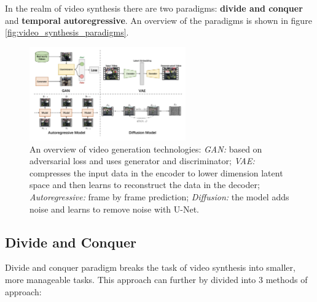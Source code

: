 In the realm of video synthesis there are two paradigms: \textbf{divide and conquer} and \textbf{temporal autoregressive}. An overview of the paradigms is shown in figure \ref{fig:video_synthesis_paradigms}.


\begin{figure}
    \centering
    \includegraphics[width=0.6\textwidth]{images/video_synthesis/generation_technologies.png}
    \caption{An overview of video generation technologies: \textit{GAN:} based on adversarial loss and uses generator and discriminator; \textit{VAE:} compresses the input data in the encoder to lower dimension latent space and then learns to reconstruct the data in the decoder; \textit{Autoregressive:} frame by frame prediction; \textit{Diffusion:} the model adds noise and learns to remove noise with U-Net.}
\end{figure}


\subsection*{Divide and Conquer}

Divide and conquer paradigm breaks the task of video synthesis into smaller, more manageable tasks. This approach can further by divided into 3 methods of approach:

